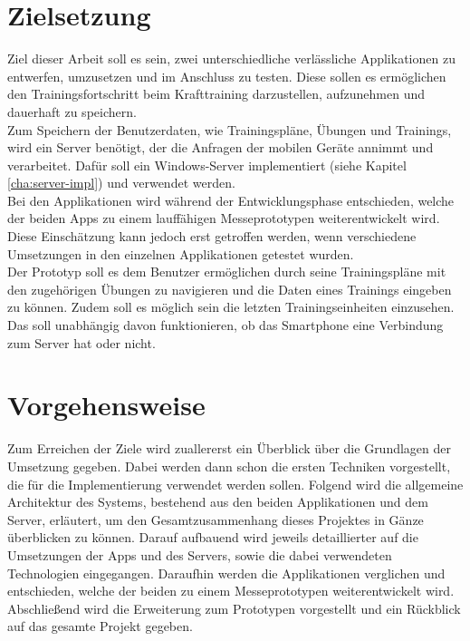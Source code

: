 \section{Zielsetzung}
\label{sec:zielsetzung}
Ziel dieser Arbeit soll es sein, zwei unterschiedliche verlässliche Applikationen zu entwerfen, umzusetzen und im Anschluss zu testen. Diese sollen es ermöglichen den Trainingsfortschritt beim Krafttraining darzustellen, aufzunehmen und dauerhaft zu speichern.\\
Zum Speichern der Benutzerdaten, wie Trainingspläne, Übungen und Trainings, wird ein Server benötigt, der die Anfragen der mobilen Geräte annimmt und verarbeitet. Dafür soll ein Windows-Server implementiert (siehe Kapitel \ref{cha:server-impl}) und verwendet werden.\\
Bei den Applikationen wird während der Entwicklungsphase entschieden, welche der beiden Apps zu einem lauffähigen Messeprototypen weiterentwickelt wird. Diese Einschätzung kann jedoch erst getroffen werden, wenn verschiedene Umsetzungen in den einzelnen Applikationen getestet wurden.\\
Der Prototyp soll es dem Benutzer ermöglichen durch seine Trainingspläne mit den zugehörigen Übungen zu navigieren und die Daten eines Trainings eingeben zu können. Zudem soll es möglich sein die letzten Trainingseinheiten einzusehen. Das soll unabhängig davon funktionieren, ob das Smartphone eine Verbindung zum Server hat oder nicht.
\section{Vorgehensweise}
\label{sec:vorgehensweise}
Zum Erreichen der Ziele wird zuallererst ein Überblick über die Grundlagen der Umsetzung gegeben. Dabei werden dann schon die ersten Techniken vorgestellt, die für die Implementierung verwendet werden sollen. Folgend wird die allgemeine Architektur des Systems, bestehend aus den beiden Applikationen und dem Server, erläutert, um den Gesamtzusammenhang dieses Projektes in Gänze überblicken zu können. Darauf aufbauend wird jeweils detaillierter auf die Umsetzungen der Apps und des Servers, sowie die dabei verwendeten Technologien eingegangen. Daraufhin werden die Applikationen verglichen und entschieden, welche der beiden zu einem Messeprototypen weiterentwickelt wird. Abschließend wird die Erweiterung zum Prototypen vorgestellt und ein Rückblick auf das gesamte Projekt gegeben.










